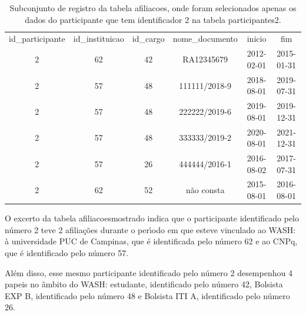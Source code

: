 \documentclass[
12pt,		%
openright,	%
twoside,  %
a4paper,			%
chapter=TITLE,		%
english,			%
french,				%
spanish,			%
brazil				%
]{USPSC-classe/USPSC}
\begin{document}
\begin{table}[htb]
\tiny
\caption{\label{e6120545268b93238330297571c4756e7c97df1a}Subconjunto de registro da tabela afiliacoes, onde foram selecionados apenas os dados do participante que tem identificador 2 na tabela participantes2.}

\centering
\begin{tabular}{|c|c|c|c|c|c|}
\hline
id\_participante  &  id\_instituicao  &  id\_cargo  &  nome\_documento  &  inicio      &  fim \\
              2  &              62  &        42  &  RA12345679      &  2012-02-01  &  2015-01-31  \\
              2  &              57  &        48  &  111111/2018-9   &  2018-08-01  &  2019-07-31  \\
              2  &              57  &        48  &  222222/2019-6   &  2019-08-01  &  2019-12-31  \\
              2  &              57  &        48  &  333333/2019-2   &  2020-08-01  &  2021-12-31  \\
              2  &              57  &        26  &  444444/2016-1   &  2016-08-02  &  2017-07-31  \\
              2  &              62  &        52  &  n\~ao consta      &  2015-08-01  &  2016-08-01 \\
\hline
\end{tabular}
\end{table}


O excerto da tabela \textquotedbl afiliacoes\textquotedbl  mostrado indica que o participante identificado pelo n\'umero 2 teve 2 afilia\c{c}\~oes durante o per\'{\i}odo em que esteve vinculado ao WASH: \`a universidade PUC de Campinas, que \'e identificada pelo n\'umero 62 e ao CNPq, que \'e identificado pelo n\'umero 57.














Al\'em disso, esse mesmo participante identificado pelo n\'umero 2 desempenhou 4 papeis no \^ambito do WASH: estudante, identificado pelo n\'umero 42, Bolsista EXP B, identificado pelo n\'umero 48 e Bolsista ITI A, identificado pelo n\'umero 26.
\end{document}
